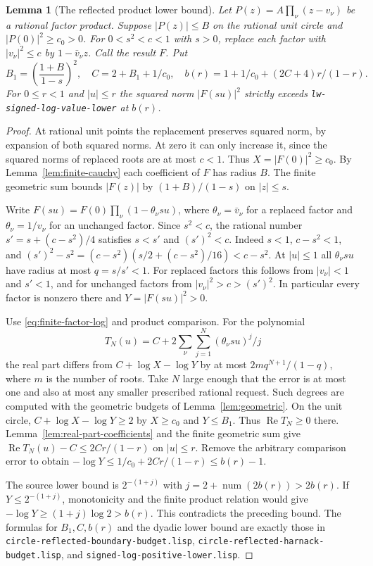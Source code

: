 \documentclass[11pt]{amsart}
\newtheorem{lemma}[theorem]{Lemma}
\theoremstyle{definition}
\theoremstyle{remark}
\numberwithin{equation}{section}
\newcommand{\re}{\operatorname{Re}}
\newcommand{\code}[1]{\nolinkurl{#1}}
\begin{document}
\begin{lemma}[The reflected product lower bound]
\label{lem:reflected-lower}
Let $P(z)=A\prod_\nu(z-v_\nu)$ be a rational factor product.
Suppose $|P(z)|\le B$ on the rational unit circle and
$|P(0)|^2\ge c_0>0$. For $0<s^2<c<1$ with $s>0$,
replace each factor with $|v_\nu|^2\le c$ by
$1-\bar v_\nu z$. Call the result $F$.
Put
\[
 B_1=\left(\frac{1+B}{1-s}\right)^2,\quad
 C=2+B_1+1/c_0,\quad
 b(r)=1+1/c_0+(2C+4)r/(1-r).
\]
For $0\le r<1$ and $|u|\le r$ the squared norm
$|F(su)|^2$ strictly exceeds
\code{lw-signed-log-value-lower} at $b(r)$.
\end{lemma}
\begin{proof}
At rational unit points the replacement preserves squared
norm, by expansion of both squared norms. At zero it can
only increase it, since the squared norms of replaced
roots are at most $c<1$. Thus $X=|F(0)|^2\ge c_0$.
By Lemma~\ref{lem:finite-cauchy} each coefficient of $F$
has radius $B$. The finite geometric sum bounds
$|F(z)|$ by $(1+B)/(1-s)$ on $|z|\le s$.

Write $F(su)=F(0)\prod_\nu(1-\theta_\nu s u)$, where
$\theta_\nu=\bar v_\nu$ for a replaced factor and
$\theta_\nu=1/v_\nu$ for an unchanged factor.
Since $s^2<c$, the rational number
$s'=s+(c-s^2)/4$ satisfies $s<s'$ and $(s')^2<c$.
Indeed $s<1$, $c-s^2<1$, and
$(s')^2-s^2=(c-s^2)(s/2+(c-s^2)/16)<c-s^2$.
At $|u|\le1$ all $\theta_\nu s u$ have radius at most
$q=s/s'<1$. For replaced factors this follows from
$|v_\nu|<1$ and $s'<1$, and for unchanged factors from
$|v_\nu|^2>c>(s')^2$. In particular every factor is
nonzero there and $Y=|F(su)|^2>0$.

Use \eqref{eq:finite-factor-log} and product comparison.
For the polynomial
\[
 T_N(u)=C+2\sum_\nu\sum_{j=1}^N(\theta_\nu su)^j/j
\]
the real part differs from $C+\log X-\log Y$ by at most
$2m q^{N+1}/(1-q)$, where $m$ is the number of roots.
Take $N$ large enough that the error is at most one and
also at most any smaller prescribed rational request.
Such degrees are computed with the geometric budgets of
Lemma~\ref{lem:geometric}. On the unit circle,
$C+\log X-\log Y\ge2$ by $X\ge c_0$ and $Y\le B_1$.
Thus $\re T_N\ge0$ there. Lemma~\ref{lem:real-part-coefficients}
and the finite geometric sum give
$\re T_N(u)-C\le2Cr/(1-r)$ on $|u|\le r$.
Remove the arbitrary comparison error to obtain
$-\log Y\le1/c_0+2Cr/(1-r)\le b(r)-1$.

The source lower bound is $2^{-(1+j)}$ with
$j=2+\operatorname{num}(2b(r))>2b(r)$.
If $Y\le2^{-(1+j)}$, monotonicity and the finite product
relation would give $-\log Y\ge(1+j)\log 2>b(r)$.
This contradicts the preceding bound. The formulas for
$B_1,C,b(r)$ and the dyadic lower bound are exactly those
in \code{circle-reflected-boundary-budget.lisp},
\code{circle-reflected-harnack-budget.lisp}, and
\code{signed-log-positive-lower.lisp}.
\end{proof}
\end{document}
